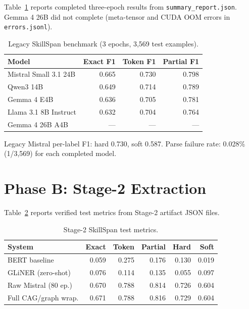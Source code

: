 \documentclass[12pt,oneside]{report}
\begin{document}
Table~\ref{tab:legacy} reports completed three-epoch results from \texttt{summary\_report.json}.
Gemma 4 26B did not complete (meta-tensor and CUDA OOM errors in \texttt{errors.jsonl}).

\begin{table}[htbp]
  \centering
  \caption{Legacy SkillSpan benchmark (3 epochs, 3{,}569 test examples).}
  \label{tab:legacy}
  \begin{tabular}{lrrr}
    \toprule
    Model & Exact F1 & Token F1 & Partial F1 \\
    \midrule
    Mistral Small 3.1 24B & 0.665 & 0.730 & 0.798 \\
    Qwen3 14B            & 0.649 & 0.714 & 0.789 \\
    Gemma 4 E4B           & 0.636 & 0.705 & 0.781 \\
    Llama 3.1 8B Instruct & 0.632 & 0.704 & 0.764 \\
    Gemma 4 26B A4B       & ---   & ---   & --- \\
    \bottomrule
  \end{tabular}
\end{table}

Legacy Mistral per-label F1: hard 0.730, soft 0.587.
Parse failure rate: 0.028\% (1/3{,}569) for each completed model.

\section{Phase B: Stage-2 Extraction}

Table~\ref{tab:stage2} reports verified test metrics from Stage-2 artifact JSON files.

\begin{table}[htbp]
  \centering
  \caption{Stage-2 SkillSpan test metrics.}
  \label{tab:stage2}
  \begin{tabular}{lrrrrr}
    \toprule
    System & Exact & Token & Partial & Hard & Soft \\
    \midrule
    BERT baseline       & 0.059 & 0.275 & 0.176 & 0.130 & 0.019 \\
    GLiNER (zero-shot)  & 0.076 & 0.114 & 0.135 & 0.055 & 0.097 \\
    Raw Mistral (80 ep.)& 0.670 & 0.788 & 0.814 & 0.726 & 0.604 \\
    Full CAG/graph wrap.& 0.671 & 0.788 & 0.816 & 0.729 & 0.604 \\
    \bottomrule
  \end{tabular}
\end{table}
\end{document}
